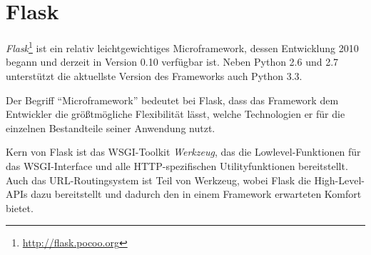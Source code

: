 \section{Flask}

\emph{Flask}\footnote{\href{http://flask.pocoo.org}{http://flask.pocoo.org}} ist ein relativ
leichtgewichtiges Microframework, dessen Entwicklung 2010 begann und derzeit in Version 0.10
verfügbar ist. Neben Python 2.6 und 2.7 unterstützt die aktuellste Version des Frameworks auch
Python 3.3.

Der Begriff \enquote{Microframework} bedeutet bei Flask, dass das Framework dem Entwickler die
größtmögliche Flexibilität lässt, welche Technologien er für die einzelnen Bestandteile seiner
Anwendung nutzt.

Kern von Flask ist das WSGI-Toolkit \emph{Werkzeug}, das die Lowlevel-Funktionen für das
WSGI-Interface und alle HTTP-spezifischen Utilityfunktionen bereitstellt. Auch das URL-Routingsystem
ist Teil von Werkzeug, wobei Flask die High-Level-APIs dazu bereitstellt und dadurch den in einem
Framework erwarteten Komfort bietet.


